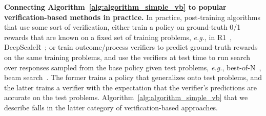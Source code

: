 \textbf{Connecting Algorithm~\ref{alg:algorithm_simple_vb} to popular verification-based methods in practice.} In practice, post-training algorithms that use some sort of verification, either train a policy on ground-truth 0/1 rewards that are known on a fixed set of training problems, \textit{e.g.}, in R1~\cite{deepseekai2025deepseekr1incentivizingreasoningcapability}, DeepScaleR~\cite{deepscaler2025}; or train outcome/process verifiers to predict ground-truth rewards on the same training problems, and use the verifiers at test time to run search over responses sampled from the base policy given test problems, \textit{e.g.}, best-of-N~\cite{cobbe2021gsm8k}, beam search~\cite{beeching2024scalingtesttimecompute,snell2024scaling,setlur2024rewarding}. The former trains a policy that generalizes onto test problems, and the latter trains a verifier with the expectation that the verifier's predictions are accurate on the test problems. Algorithm~\ref{alg:algorithm_simple_vb} that we describe falls in the latter category of verification-based approaches.

